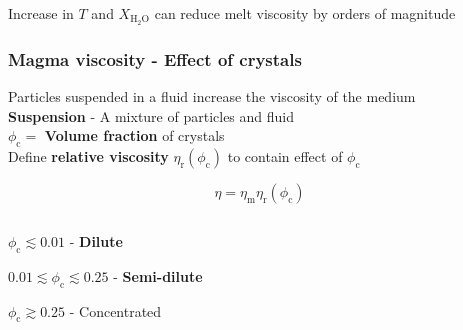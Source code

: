 \documentclass{beamer}
\begin{document}
\begin{frame}
\begin{columns}[t]
\begin{column}{0.45\paperwidth}
    \end{column}

  \end{columns}

  Increase in $T$ and $X_{\text{H}_{2}\text{O}}$ can reduce melt viscosity by orders of magnitude \\
    
\end{frame}
\begin{frame}
  \frametitle{Magma viscosity - Effect of crystals}

  Particles suspended in a fluid increase the viscosity of the medium \\

  \textbf{Suspension} - A mixture of particles and fluid \\

  $\phi_{\text{c}} = $ \textbf{Volume fraction} of crystals \\

  Define \textbf{relative viscosity} $\eta_{\text{r}}(\phi_{\text{c}})$ to contain effect of $\phi_{\text{c}}$

  $$ \eta = \eta_{\text{m}} \eta_{\text{r}}(\phi_{\text{c}}) $$

  \vspace{0.5cm}
  
  \begin{columns}[t]

    \begin{column}{0.5\textwidth}

      $\phi_{\text{c}} \lesssim 0.01$ - \textbf{Dilute} \\

      \vspace{0.5cm}
      
      $0.01 \lesssim \phi_{\text{c}} \lesssim 0.25$ - \textbf{Semi-dilute} \\

      \vspace{0.5cm}
      
      $\phi_{\text{c}} \gtrsim 0.25$ - Concentrated \\

    \end{column}

    \begin{column}{0.5\textwidth}

      \vspace{-1.5cm}
      

\end{column}
\end{columns}
\end{frame}
\end{document}
